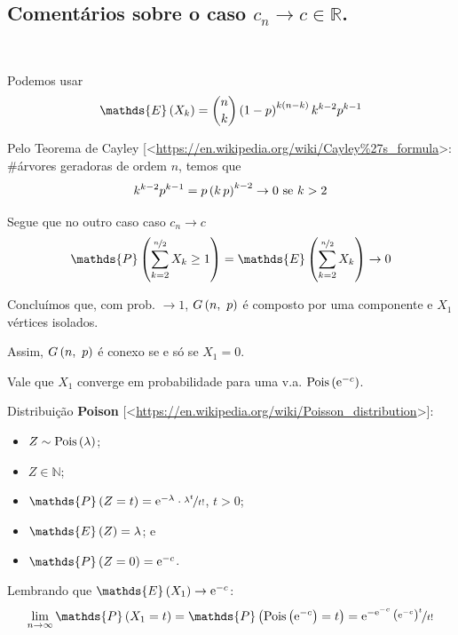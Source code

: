 \clearpage
\subsection*{\normalfont Comentários sobre o caso $c_n\rightarrow c\in\mathds{R}$.}$ $\newline

Podemos usar
\vspace*{-\baselineskip}
\[
  \mathds{E}\left(X_k\vphantom{1j}\right) = \binom{n}{k} \left(1-p\vphantom{1j}\right)^{k\left(n-k\vphantom{1j}\right)} k^{k-2} p^{k-1}
\]

Pelo Teorema de Cayley [<\href{https://en.wikipedia.org/wiki/Cayley%27s_formula}{https://en.wikipedia.org/wiki/Cayley\%27s\_formula}>: \#árvores geradoras de ordem $n$, temos que
\[
  k^{k-2} p^{k-1} = p\left(k\,p\vphantom{1j}\right)^{k-2} \rightarrow 0 \text{ se } k>2
\]

Segue que no outro caso caso $c_n\rightarrow c$
\[
  \mathds{P}\left(\sum_{k=2}^{\nicefrac{n}{2}} X_k \geq 1\vphantom{1j}\right) = \mathds{E}\left(\sum_{k=2}^{\nicefrac{n}{2}} X_k\vphantom{1j}\right) \rightarrow 0
\]

Concluímos que, com prob. $\rightarrow1$, $G\left(n,\ p\vphantom{1j}\right)$ é composto por uma componente e $X_1$ vértices isolados.

Assim, $G\left(n,\ p\vphantom{1j}\right)$ é conexo se e só se $X_1=0$.

Vale que $X_1$ converge em probabilidade para uma v.a. $\mathrm{Pois}\left(\mathrm{e}^{-c}\vphantom{1j}\right)$.

Distribuição \textbf{Poison} [<\href{https://en.wikipedia.org/wiki/Poisson_distribution}{https://en.wikipedia.org/wiki/Poisson\_distribution}>]:
\begin{itemize}
  \item $Z\sim\mathrm{Pois}\left(\lambda\vphantom{1j}\right)$;
  \item $Z\in\mathds{N}$;
  \item $\mathds{P}\left(Z=t\vphantom{1j}\right) = \mathrm{e}^{-\lambda}\cdot\nicefrac{\lambda^t}{t!}$, $t>0$;
  \item $\mathds{E}\left(Z\vphantom{1j}\right) = \lambda$; e 
  \item $\mathds{P}\left(Z=0\vphantom{1j}\right) = \mathrm{e}^{-c}$.
\end{itemize}

Lembrando que $\mathds{E}\left(X_1\vphantom{1j}\right)\rightarrow\mathrm{e}^{-c}$:
\[
  \lim_{n\rightarrow\infty} \mathds{P}\left(X_1=t\vphantom{1j}\right)
    = \mathds{P}\left(\mathrm{Pois}\left(\mathrm{e}^{-c}\vphantom{1j}\right)=t\vphantom{1j}\right)
    = \mathrm{e}^{-\mathrm{e}^{-c}}\,\nicefrac{\left(\mathrm{e}^{-c}\vphantom{1j}\right)^t}{t!}
\]

